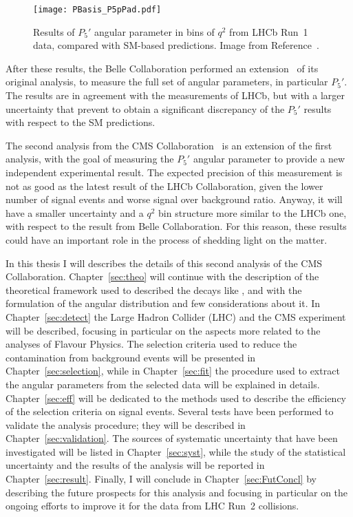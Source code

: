 \begin{figure}[!hbt]
  \centering
  \texttt{[image: PBasis\_P5pPad.pdf]}
  \caption{Results of $P_5'$ angular parameter in bins of $q^2$ from LHCb Run~1 data, compared with SM-based predictions.
    Image from Reference~\cite{Aaij:2015oid}.}
  \label{fig:LHCb}
\end{figure}

After these results, the Belle Collaboration performed an extension~\cite{BelleP5p} of its original analysis, to measure the full set of angular parameters, in particular $P_5'$.
The results are in agreement with the measurements of LHCb, but with a larger uncertainty that prevent to obtain a significant discrepancy of the $P_5'$ results with respect to the SM predictions.

The second analysis from the CMS Collaboration~\cite{Sirunyan:2017dhj} is an extension of the first analysis, with the goal of measuring the $P_5'$ angular parameter to provide a new independent experimental result.
The expected precision of this measurement is not as good as the latest result of the LHCb Collaboration, given the lower number of signal events and worse signal over background ratio.
Anyway, it will have a smaller uncertainty and a $q^2$ bin structure more similar to the LHCb one, with respect to the result from Belle Collaboration.
For this reason, these results could have an important role in the process of shedding light on the matter.

In this thesis I will describes the details of this second analysis of the CMS Collaboration.
Chapter~\ref{sec:theo} will continue with the description of the theoretical framework used to described the decays like \BtoKstmumu, and with the formulation of the angular distribution and few considerations about it.
In Chapter~\ref{sec:detect} the Large Hadron Collider (LHC) and the CMS experiment will be described, focusing in particular on the aspects more related to the analyses of Flavour Physics.
The selection criteria used to reduce the contamination from background events will be presented in Chapter~\ref{sec:selection}, while in Chapter~\ref{sec:fit} the procedure used to extract the angular parameters from the selected data will be explained in details.
Chapter~\ref{sec:eff} will be dedicated to the methods used to describe the efficiency of the selection criteria on signal events.
Several tests have been performed to validate the analysis procedure; they will be described in Chapter~\ref{sec:validation}.
The sources of systematic uncertainty that have been investigated will be listed in Chapter~\ref{sec:syst}, while the study of the statistical uncertainty and the results of the analysis will be reported in Chapter~\ref{sec:result}.
Finally, I will conclude in Chapter~\ref{sec:FutConcl} by describing the future prospects for this analysis and focusing in particular on the ongoing efforts to improve it for the data from LHC Run~2 collisions.


